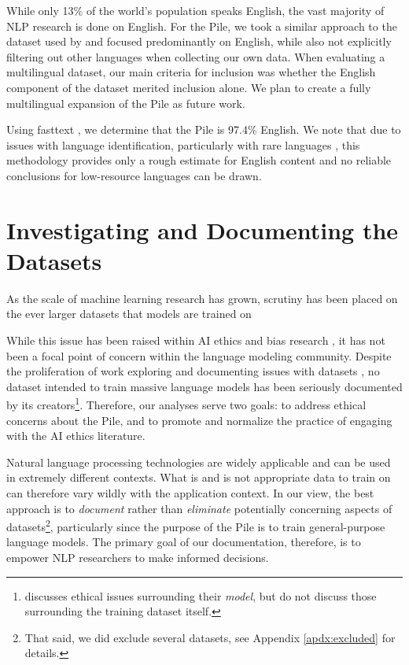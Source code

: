 While only 13\% of the world's population speaks English, the vast majority of NLP research is done on English. For the Pile, we took a similar approach to the dataset used by \citet{GPT3} and focused predominantly on English, while also not explicitly filtering out other languages when collecting our own data. When evaluating a multilingual dataset, our main criteria for inclusion was whether the English component of the dataset merited inclusion alone. We plan to create a fully multilingual expansion of the Pile as future work.

Using fasttext \cite{fast-text}, we determine that the Pile is 97.4\% English. We note that due to issues with language identification, particularly with rare languages \citet{caswell2020language}, this methodology provides only a rough estimate for English content and no reliable conclusions for low-resource languages can be drawn. 

\section{Investigating and Documenting the Datasets}\label{sec:doc}

As the scale of machine learning research has grown, scrutiny has been placed on the ever larger datasets that models are trained on \citep{pyrrhic-cv,best-practice2}

While this issue has been raised within AI ethics and bias research \citep{nlp-impact,disability-bias,nlp-bias-survey}, it has not been a focal point of concern within the language modeling community. Despite the proliferation of work exploring and documenting issues with datasets \citep{datasheets,datastatement,archives}, no dataset intended to train massive language models has been seriously documented by its creators\footnote{\citet{GPT3} discusses ethical issues surrounding their \textit{model}, but do not discuss those surrounding the training dataset itself.}. Therefore, our analyses serve two goals: to address ethical concerns about the Pile, and to promote and normalize the practice of engaging with the AI ethics literature.

Natural language processing technologies are widely applicable and can be used in extremely different contexts. What is and is not appropriate data to train on can therefore vary wildly with the application context. In our view, the best approach is to \textit{document} rather than \textit{eliminate} potentially concerning aspects of datasets\footnote{That said, we did exclude several datasets, see Appendix \ref{apdx:excluded} for details.}, particularly since the purpose of the Pile is to train general-purpose language models. The primary goal of our documentation, therefore, is to empower NLP researchers to make informed decisions.

